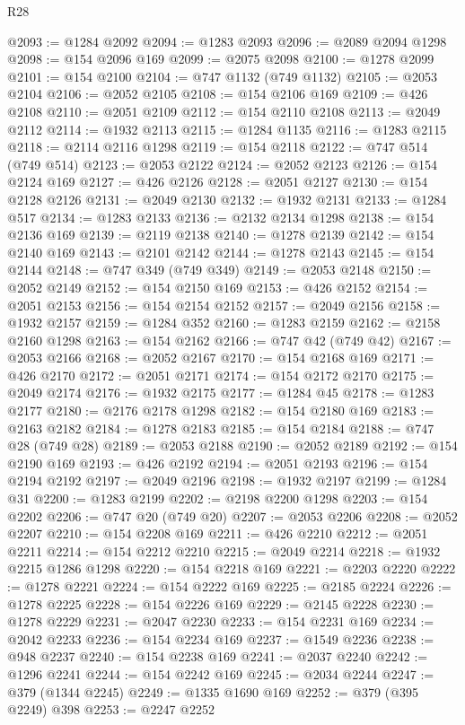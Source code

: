 \begin{lexlean}{R28}
\begin{coremodule}
@2093 := @1284 @2092
@2094 := @1283 @2093
@2096 := @2089 @2094 @1298
@2098 := @154 @2096 @169
@2099 := @2075 @2098
@2100 := @1278 @2099
@2101 := @154 @2100
@2104 := @747 @1132 (@749 @1132)
@2105 := @2053 @2104
@2106 := @2052 @2105
@2108 := @154 @2106 @169
@2109 := @426 @2108
@2110 := @2051 @2109
@2112 := @154 @2110 @2108
@2113 := @2049 @2112
@2114 := @1932 @2113
@2115 := @1284 @1135
@2116 := @1283 @2115
@2118 := @2114 @2116 @1298
@2119 := @154 @2118
@2122 := @747 @514 (@749 @514)
@2123 := @2053 @2122
@2124 := @2052 @2123
@2126 := @154 @2124 @169
@2127 := @426 @2126
@2128 := @2051 @2127
@2130 := @154 @2128 @2126
@2131 := @2049 @2130
@2132 := @1932 @2131
@2133 := @1284 @517
@2134 := @1283 @2133
@2136 := @2132 @2134 @1298
@2138 := @154 @2136 @169
@2139 := @2119 @2138
@2140 := @1278 @2139
@2142 := @154 @2140 @169
@2143 := @2101 @2142
@2144 := @1278 @2143
@2145 := @154 @2144
@2148 := @747 @349 (@749 @349)
@2149 := @2053 @2148
@2150 := @2052 @2149
@2152 := @154 @2150 @169
@2153 := @426 @2152
@2154 := @2051 @2153
@2156 := @154 @2154 @2152
@2157 := @2049 @2156
@2158 := @1932 @2157
@2159 := @1284 @352
@2160 := @1283 @2159
@2162 := @2158 @2160 @1298
@2163 := @154 @2162
@2166 := @747 @42 (@749 @42)
@2167 := @2053 @2166
@2168 := @2052 @2167
@2170 := @154 @2168 @169
@2171 := @426 @2170
@2172 := @2051 @2171
@2174 := @154 @2172 @2170
@2175 := @2049 @2174
@2176 := @1932 @2175
@2177 := @1284 @45
@2178 := @1283 @2177
@2180 := @2176 @2178 @1298
@2182 := @154 @2180 @169
@2183 := @2163 @2182
@2184 := @1278 @2183
@2185 := @154 @2184
@2188 := @747 @28 (@749 @28)
@2189 := @2053 @2188
@2190 := @2052 @2189
@2192 := @154 @2190 @169
@2193 := @426 @2192
@2194 := @2051 @2193
@2196 := @154 @2194 @2192
@2197 := @2049 @2196
@2198 := @1932 @2197
@2199 := @1284 @31
@2200 := @1283 @2199
@2202 := @2198 @2200 @1298
@2203 := @154 @2202
@2206 := @747 @20 (@749 @20)
@2207 := @2053 @2206
@2208 := @2052 @2207
@2210 := @154 @2208 @169
@2211 := @426 @2210
@2212 := @2051 @2211
@2214 := @154 @2212 @2210
@2215 := @2049 @2214
@2218 := @1932 @2215 @1286 @1298
@2220 := @154 @2218 @169
@2221 := @2203 @2220
@2222 := @1278 @2221
@2224 := @154 @2222 @169
@2225 := @2185 @2224
@2226 := @1278 @2225
@2228 := @154 @2226 @169
@2229 := @2145 @2228
@2230 := @1278 @2229
@2231 := @2047 @2230
@2233 := @154 @2231 @169
@2234 := @2042 @2233
@2236 := @154 @2234 @169
@2237 := @1549 @2236
@2238 := @948 @2237
@2240 := @154 @2238 @169
@2241 := @2037 @2240
@2242 := @1296 @2241
@2244 := @154 @2242 @169
@2245 := @2034 @2244
@2247 := @379 (@1344 @2245)
@2249 := @1335 @1690 @169
@2252 := @379 (@395 @2249) @398
@2253 := @2247 @2252

\end{coremodule}
\end{lexlean}
